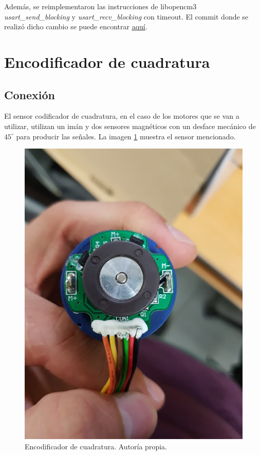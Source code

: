 Además, se reimplementaron las instrucciones de libopencm3 \textit{usart\_send\_blocking} y \textit{usart\_recv\_blocking} con timeout. El commit donde se realizó dicho cambio se puede encontrar \href{https://github.com/arcoslab/stm32-roboclaw/commit/de483b19c8b88b6c0c21cd51b446042f611a888b#diff-ceb3425682487491df75810266c27b6d}{aquí}.

\section{Encodificador de cuadratura}

\subsection{Conexión}

El sensor codificador de cuadratura, en el caso de los motores que se van a utilizar, utilizan un imán y dos sensores magnéticos con un desface mecánico de $45^\circ$ para producir las señales. La imagen \ref{F:encoderfisico} muestra el sensor mencionado.

\begin{figure}[h!]
\centering
\includegraphics[scale=0.5]{imagenes/encoder.jpg}
\caption{Encodificador de cuadratura. Autoría propia.}
\label{F:encoderfisico}
\end{figure}

